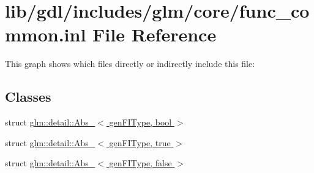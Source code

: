 \hypertarget{func__common_8inl}{}\section{lib/gdl/includes/glm/core/func\+\_\+common.inl File Reference}
\label{func__common_8inl}
This graph shows which files directly or indirectly include this file\+:
\subsection*{Classes}
\begin{DoxyCompactItemize}
\item 
struct \hyperlink{structglm_1_1detail_1_1_abs__}{glm\+::detail\+::\+Abs\+\_\+$<$ gen\+F\+I\+Type, bool $>$}
\item 
struct \hyperlink{structglm_1_1detail_1_1_abs___3_01gen_f_i_type_00_01true_01_4}{glm\+::detail\+::\+Abs\+\_\+$<$ gen\+F\+I\+Type, true $>$}
\item 
struct \hyperlink{structglm_1_1detail_1_1_abs___3_01gen_f_i_type_00_01false_01_4}{glm\+::detail\+::\+Abs\+\_\+$<$ gen\+F\+I\+Type, false $>$}
\end{DoxyCompactItemize}

